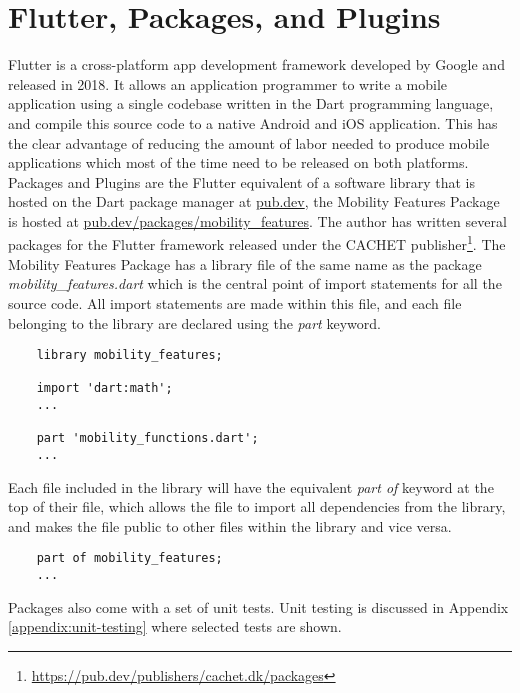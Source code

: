 \section{Flutter, Packages, and Plugins}
Flutter is a cross-platform app development framework developed by Google and released in 2018. It allows an application programmer to write a mobile application using a single codebase written in the Dart programming language, and compile this source code to a native Android and iOS application. This has the clear advantage of reducing the amount of labor needed to produce mobile applications which most of the time need to be released on both platforms. Packages and Plugins are the Flutter equivalent of a software library that is hosted on the Dart package manager at \url{pub.dev}, the Mobility Features Package is hosted at \url{pub.dev/packages/mobility_features}. The author has written several packages for the Flutter framework released under the CACHET publisher\footnote{\url{https://pub.dev/publishers/cachet.dk/packages}}. The Mobility Features Package has a library file of the same name as the package \textit{mobility\_features.dart} which is the central point of import statements for all the source code. All import statements are made within this file, and each file belonging to the library are declared using the \textit{part} keyword.

\begin{verbatim}
    library mobility_features;
    
    import 'dart:math';
    ...
    
    part 'mobility_functions.dart';
    ...
\end{verbatim}

Each file included in the library will have the equivalent \textit{part of} keyword at the top of their file, which allows the file to import all dependencies from the library, and makes the file public to other files within the library and vice versa.

\begin{verbatim}
    part of mobility_features;
    ...
\end{verbatim}

Packages also come with a set of unit tests. Unit testing is discussed in Appendix \ref{appendix:unit-testing} where selected tests are shown.